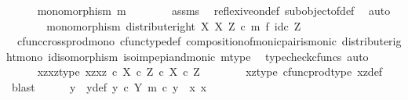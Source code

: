 \begin{isabellebody}
\ \ \ \ \isamarkupfalse%
\ {\isachardoublequoteopen}monomorphism\ m{\isachardoublequoteclose}\isanewline
\ \ \ \ \ \ \isamarkupfalse%
\ assms\ \isamarkupfalse%
\ reflexive{\isacharunderscore}{\kern0pt}on{\isacharunderscore}{\kern0pt}def\ subobject{\isacharunderscore}{\kern0pt}of{\isacharunderscore}{\kern0pt}def{}\ \isamarkupfalse%
\ auto\isanewline
\ \ \ \ \isamarkupfalse%
\ \isamarkupfalse%
\ {\isachardoublequoteopen}monomorphism\ {\isacharparenleft}{\kern0pt}distribute{\isacharunderscore}{\kern0pt}right\ X\ X\ Z\ {\isasymcirc}\isactrlsub c\ m\ {\isasymtimes}\isactrlsub f\ id\isactrlsub c\ Z{\isacharparenright}{\kern0pt}{\isachardoublequoteclose}\isanewline
\ \ \ \ \ \ \isamarkupfalse%
\ \ cfunc{\isacharunderscore}{\kern0pt}cross{\isacharunderscore}{\kern0pt}prod{\isacharunderscore}{\kern0pt}mono\ cfunc{\isacharunderscore}{\kern0pt}type{\isacharunderscore}{\kern0pt}def\ composition{\isacharunderscore}{\kern0pt}of{\isacharunderscore}{\kern0pt}monic{\isacharunderscore}{\kern0pt}pair{\isacharunderscore}{\kern0pt}is{\isacharunderscore}{\kern0pt}monic\ distribute{\isacharunderscore}{\kern0pt}right{\isacharunderscore}{\kern0pt}mono\ id{\isacharunderscore}{\kern0pt}isomorphism\ iso{\isacharunderscore}{\kern0pt}imp{\isacharunderscore}{\kern0pt}epi{\isacharunderscore}{\kern0pt}and{\isacharunderscore}{\kern0pt}monic\ m{\isacharunderscore}{\kern0pt}type\ \isamarkupfalse%
\ {\isacharparenleft}{\kern0pt}typecheck{\isacharunderscore}{\kern0pt}cfuncs{\isacharcomma}{\kern0pt}\ auto{\isacharparenright}{\kern0pt}\isanewline
\ \ \isamarkupfalse%
\isanewline
\ \ \ \ \isamarkupfalse%
\ xzxz{\isacharunderscore}{\kern0pt}type{\isacharcolon}{\kern0pt}\ {\isachardoublequoteopen}{\isasymlangle}{\isasymlangle}x{\isacharcomma}{\kern0pt}z{\isasymrangle}{\isacharcomma}{\kern0pt}{\isasymlangle}x{\isacharcomma}{\kern0pt}z{\isasymrangle}{\isasymrangle}\ {\isasymin}\isactrlsub c\ {\isacharparenleft}{\kern0pt}X\ {\isasymtimes}\isactrlsub c\ Z{\isacharparenright}{\kern0pt}\ {\isasymtimes}\isactrlsub c\ X\ {\isasymtimes}\isactrlsub c\ Z{\isachardoublequoteclose}\isanewline
\ \ \ \ \ \ \isamarkupfalse%
\ xz{\isacharunderscore}{\kern0pt}type\ cfunc{\isacharunderscore}{\kern0pt}prod{\isacharunderscore}{\kern0pt}type\ xz{\isacharunderscore}{\kern0pt}def\ \isamarkupfalse%
\ blast\isanewline
\ \ \ \ \isamarkupfalse%
\ y\ \ y{\isacharunderscore}{\kern0pt}def{\isacharcolon}{\kern0pt}\ {\isachardoublequoteopen}y\ {\isasymin}\isactrlsub c\ Y{\isachardoublequoteclose}\ {\isachardoublequoteopen}m\ {\isasymcirc}\isactrlsub c\ y\ {\isacharequal}{\kern0pt}\ {\isasymlangle}x{\isacharcomma}{\kern0pt}\ x{\isasymrangle}{\isachardoublequoteclose}\isanewline

\end{isabellebody}
